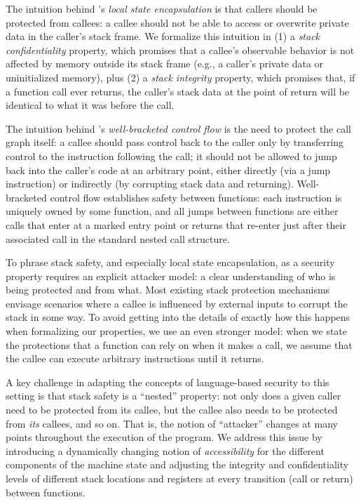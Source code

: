 \documentclass[acmsmall,review,anonymous]{acmart}\settopmatter{printfolios=true,printccs=false,printacmref=false}
\begin{document}
The intuition behind \citeauthor{Skorstengaard+19}'s {\em
  local state encapsulation} is that callers should be protected from
callees: a callee should not be able to access or overwrite private data
in the caller's stack frame.
%
We formalize this intuition in (1) a {\em stack confidentiality}
property, which promises that a callee's observable behavior is not affected
by memory outside its stack frame (e.g., a caller's private data or
uninitialized memory), plus (2) a {\em stack integrity} property,
which promises that, if a function call ever returns, the caller's stack
data at the point of return will be identical to what it was before the
call.

The intuition behind \citeauthor{Skorstengaard+19}'s {\em
  well-bracketed control flow} is the need to protect the call graph
itself: a callee should pass control back to the caller only by
transferring control to the instruction
following the call; it should not be allowed to jump back into the
caller's code at an arbitrary point, either directly (via a jump
instruction) or indirectly (by corrupting stack data and
returning). Well-bracketed control flow establishes safety between
functions: each instruction is uniquely owned by some function, and
all jumps between functions are either calls that enter at a marked
entry point or returns that re-enter just after their associated call
in the standard nested call structure.  

To phrase stack safety, and especially local state encapsulation, as a
security property requires an explicit attacker model: a clear
understanding of who is being protected and from what. Most existing
stack protection mechanisms envisage scenarios where a callee is
influenced by external inputs to corrupt the stack in some way. To
avoid getting into the details of exactly how this happens when
formalizing our properties, we use an even stronger model: when we
state the protections that a function can rely on when it makes a
call, we assume that the callee can execute arbitrary instructions
until it returns.

A key challenge in adapting the concepts of language-based security to this
setting is that stack safety is a ``nested'' property: not only does a given
caller need to be protected from its callee, but the callee also needs to be
protected from {\em its} callees, and so on. That is, the notion of
``attacker'' changes at many points throughout the execution of the program.
We address
this issue by introducing a dynamically changing notion of {\em accessibility} for
the different components of the machine state and adjusting the integrity
and confidentiality levels of different stack locations and registers at
every transition (call or return) between functions.
\end{document}
